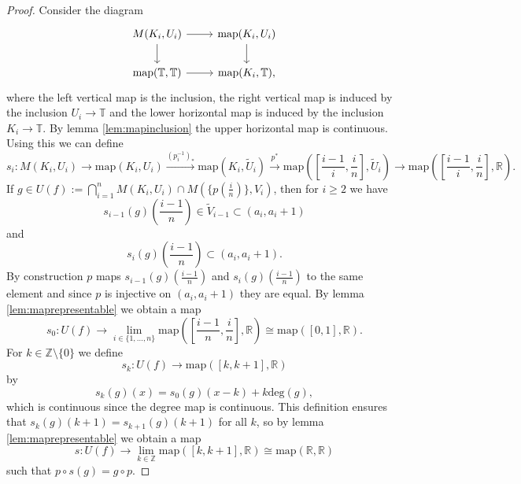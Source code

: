 \documentclass[8pt, oneside]{article}
\theoremstyle{definition}
\newcommand{\RR}{\mathbb{R}}
\newcommand{\ZZ}{\mathbb{Z}}
\newcommand{\TT}{\mathbb{T}}
\newcommand{\map}{\mathrm{map}}
\begin{document}
\begin{proof}
Consider the diagram
$$
\begin{tikzcd}
M(K_i, U_i)\arrow{r}\arrow{d}
&\map(K_i, U_i)\arrow{d}\\
\map(\TT,\TT)\arrow{r}
&\map(K_i, \TT),
\end{tikzcd}
$$
where the left vertical map is the inclusion, the right vertical map is induced
by the inclusion $U_i\to \TT$ and the lower horizontal map is induced
by the inclusion $K_i\to \TT$. By lemma \ref{lem:mapinclusion} the upper
horizontal map is continuous. Using this we can define
$$s_i:M(K_i, U_i)\rightarrow \map(K_i, U_i)\xrightarrow{(p_i^{-1})_\ast} 
\map(K_i, \tilde U_i)\xrightarrow{p^\ast}\map\left(\left[\frac{i-1}{i}, \frac{i}{n}\right], \tilde U_i\right)
\to \map\left(\left[\frac{i-1}{i}, \frac{i}{n}\right], \RR\right).$$
If $g\in U(f):=\bigcap_{i = 1}^n M(K_i, U_i)\cap M(\{p(\frac{i}{n})\}, V_i)$, then 
for $i\ge 2$ we have
$$s_{i-1}(g)\left(\frac{i-1}{n}\right)\in \tilde V_{i-1} \subset(a_{i}, a_i+1)$$ 
and  
$$s_{i}(g)\left(\frac{i-1}{n}\right)\subset (a_i, a_i+1).$$ By construction $p$ maps 
$s_{i-1}(g)(\frac{i-1}{n})$ and $s_{i}(g)(\frac{i-1}{n})$ to the same element
and since $p$ is injective on $(a_i, a_i+1)$ they are equal. By lemma \ref{lem:maprepresentable}
we obtain a map
$$s_0:U(f)
\to \lim_{i\in \{1,\ldots, n\}} \map\left(\left[\frac{i-1}{n},
\frac{i}{n}\right],\RR\right)\cong \map([0,1],\RR).$$
For $k\in \ZZ\setminus \{0\}$ we define
$$s_k:U(f)\to \map([k, k+1],\RR)$$
by
$$s_k(g)(x) = s_0(g)(x-k) + k\mathrm{deg}(g),$$
which is continuous since the degree map is continuous. This
definition ensures that $s_k(g)(k+1) = s_{k+1}(g)(k+1)$ for all $k$,
so by lemma \ref{lem:maprepresentable} we obtain a map
$$s:U(f)\to \lim_{k\in \ZZ} \map([k, k+1], \RR)\cong \map(\RR,\RR)$$
such that $p\circ s(g) = g\circ p$.
\end{proof}
\end{document}
